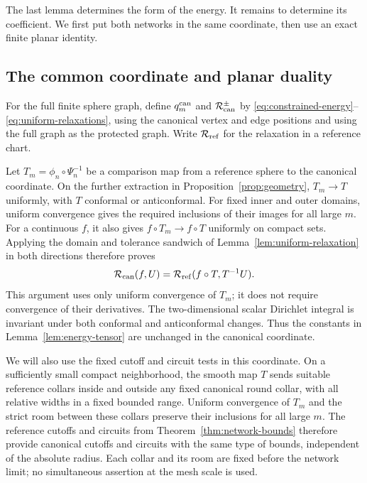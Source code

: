 The last lemma determines the form of the energy.  It remains to determine
its coefficient.  We first put both networks in the same coordinate, then
use an exact finite planar identity.

\subsection{The common coordinate and planar duality}

For the full finite sphere graph, define \(q_m^{\rm can}\) and
\(\mathcal R_{\rm can}^{\pm}\) by
\eqref{eq:constrained-energy}--\eqref{eq:uniform-relaxations}, using the
canonical vertex and edge positions and using the full graph as the
protected graph.  Write \(\mathcal R_{\rm ref}\) for the relaxation in
a reference chart.

Let \(T_m=\phi_n\circ \Psi_n^{-1}\) be a comparison map from a reference
sphere to the canonical coordinate.  On the further extraction in
Proposition~\ref{prop:geometry}, \(T_m\to T\) uniformly, with \(T\)
conformal or anticonformal.  For fixed inner and outer domains,
uniform convergence gives the required inclusions of their images for
all large \(m\).  For a continuous \(f\), it also gives
\(f\circ T_m\to f\circ T\) uniformly on compact sets.  Applying the
domain and tolerance sandwich of Lemma~\ref{lem:uniform-relaxation}
in both directions therefore proves
\begin{equation}\label{eq:coordinate-relaxation}
 \mathcal R_{\rm can}(f,U)
   =\mathcal R_{\rm ref}(f\circ T,T^{-1}U).
\end{equation}
This argument uses only uniform convergence of \(T_m\); it does not require
convergence of their derivatives.  The two-dimensional scalar Dirichlet
integral is invariant under both conformal and anticonformal changes.
Thus the constants in Lemma~\ref{lem:energy-tensor} are unchanged in the
canonical coordinate.

We will also use the fixed cutoff and circuit tests in this coordinate.
On a sufficiently small compact neighborhood, the smooth map \(T\)
sends suitable reference collars inside and outside any fixed canonical
round collar, with all relative widths in a fixed bounded range.
Uniform convergence of \(T_m\) and the strict room between these collars
preserve their inclusions for all large \(m\).  The reference cutoffs
and circuits from Theorem~\ref{thm:network-bounds} therefore provide
canonical cutoffs and circuits with the same type of bounds, independent
of the absolute radius.  Each collar and its room are fixed before the
network limit; no simultaneous assertion at the mesh scale is used.

